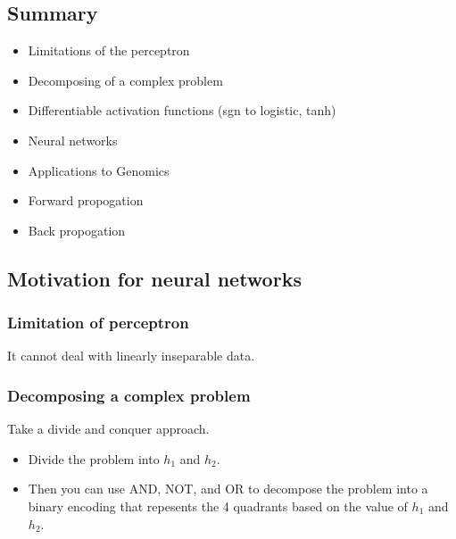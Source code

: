 \subsection{Summary}
\begin{intuition}
    \begin{itemize}
        \item Limitations of the perceptron
        \item Decomposing of a complex problem
        \item Differentiable activation functions (sgn to logistic, tanh)
        \item Neural networks
        \item Applications to Genomics
        \item Forward propogation
        \item Back propogation
    \end{itemize}
\end{intuition}

\subsection{Motivation for neural networks}

\subsubsection{Limitation of perceptron}
\begin{intuition}
    It cannot deal with linearly inseparable data. 
\end{intuition}

\subsubsection{Decomposing a complex problem}
\begin{intuition}
    Take a divide and conquer approach.
    \begin{itemize}
        \item Divide the problem into $h_1$ and $h_2$. 
        \item Then you can use AND, NOT, and OR to decompose the problem into a binary encoding that repesents the 4 quadrants based on the value of $h_1$ and $h_2$. 
    \end{itemize}
\end{intuition}


